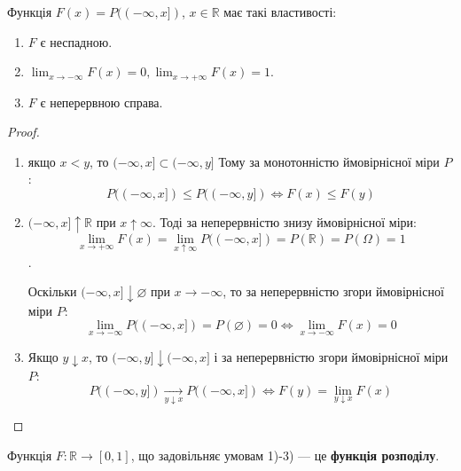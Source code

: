 \begin{theorem}
    Функція $F(x) = P((-\infty, x])$, $x \in \mathbb{R}$
    має такі властивості:

    \begin{enumerate}
        \item $F$ є неспадною.
        \item $\lim_{x \rightarrow -\infty} F(x) = 0, \lim_{x \rightarrow +\infty} F(x) = 1$.
        \item $F$ є неперервною справа.
    \end{enumerate}
\end{theorem}
\begin{proof}
    \begin{enumerate}
        \item якщо $x < y$, то $(-\infty, x] \subset (-\infty, y]$
        Тому за монотонністю ймовірнісної міри $P$:
        $$P((-\infty, x]) \leqslant P((-\infty, y]) \Leftrightarrow
        F(x) \leqslant F(y)$$

        \item $(-\infty, x] \uparrow \mathbb{R}$ при $x \uparrow \infty$.
        Тоді за неперервністю знизу ймовірнісної міри:
        $$\lim\limits_{x \rightarrow +\infty} F(x)
        = \lim\limits_{x \uparrow \infty} P((-\infty, x])
        = P(\mathbb{R})
        = P(\Omega)
        = 1$$.
        
        Оскільки $(-\infty, x] \downarrow \varnothing$ при
        $x \rightarrow -\infty$, то за неперервністю згори
        ймовірнісної міри $P$:
        $$\lim\limits_{x \rightarrow -\infty} P((-\infty, x]) = P(\varnothing) = 0 \Leftrightarrow
        \lim\limits_{x \rightarrow -\infty} F(x) = 0$$
        
        \item Якщо $y \downarrow x$, то $(-\infty, y] \downarrow (-\infty, x]$ і за
        неперервністю згори ймовірнісної міри $P$:
        $$P((-\infty, y]) \xrightarrow[y \downarrow x]{} P((-\infty, x]) \Leftrightarrow 
        F(y) = \lim\limits_{y \downarrow x} F(x)$$
    \end{enumerate}
\end{proof}

\begin{definition}
    Функція $F: \mathbb{R} \rightarrow [0, 1]$, що задовільняє
    умовам 1)-3) --- це \textbf{функція розподілу}.
\end{definition}

